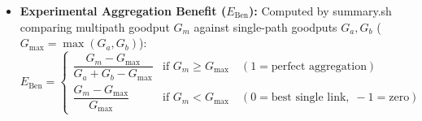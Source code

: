 \documentclass[10pt,a4paper]{article}
\newcommand{\codeul}{\textunderscore\hspace{0pt}}
\DeclareRobustCommand{\code}[1]{{\ttfamily\let\_\codeul #1}}
\begin{document}
\begin{itemize}
    \item \textbf{Experimental Aggregation Benefit ($E_{\text{Ben}}$):} Computed by \code{summary.sh} comparing multipath goodput $G_m$ against single-path goodputs $G_a, G_b$ ($G_{\max} = \max(G_a, G_b)$):
    \begin{equation}
        E_{\text{Ben}} =
        \begin{cases}
            \dfrac{G_m - G_{\max}}{G_a + G_b - G_{\max}} & \text{if } G_m \ge G_{\max} \quad (1 = \text{perfect aggregation}) \\[8pt]
            \dfrac{G_m - G_{\max}}{G_{\max}} & \text{if } G_m < G_{\max} \quad (0 = \text{best single link},\; -1 = \text{zero})
        \end{cases}
    \end{equation}
\end{itemize}
\end{document}
